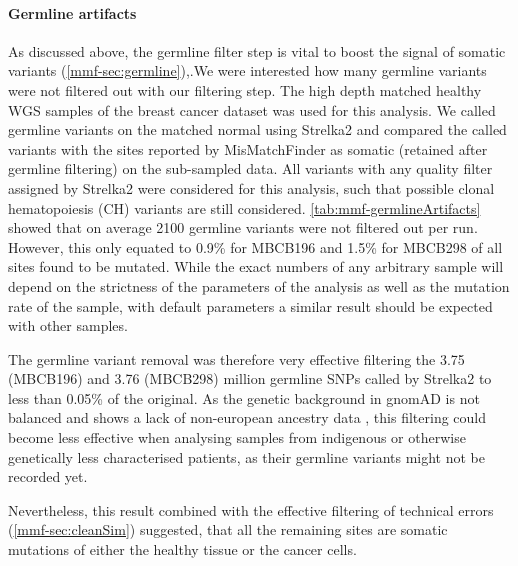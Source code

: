 \paragraph{Germline artifacts}
\label{mmf-sec:germlineArtifacts}
As discussed above, the germline filter step is vital to boost the signal of somatic variants (\autoref{mmf-sec:germline}),.We were interested how many germline variants were not filtered out with our filtering step. The high depth matched healthy WGS samples of the breast cancer dataset was used for this analysis. We called germline variants on the matched normal using Strelka2 and compared the called variants with the sites reported by MisMatchFinder as somatic (retained after germline filtering) on the sub-sampled data. All variants with any quality filter assigned by Strelka2 were considered for this analysis, such that possible clonal hematopoiesis (CH) variants are still considered. \autoref{tab:mmf-germlineArtifacts} showed that on average 2100 germline variants were not filtered out per run. However, this only equated to 0.9\% for MBCB196 and 1.5\% for MBCB298 of all sites found to be mutated. While the exact numbers of any arbitrary sample will depend on the strictness of the parameters of the analysis as well as the mutation rate of the sample, with default parameters a similar result should be expected with other samples.

The germline variant removal was therefore very effective filtering the 3.75 (MBCB196) and 3.76 (MBCB298) million germline SNPs called by Strelka2 to less than 0.05\% of the original. As the genetic background in gnomAD is not balanced and shows a lack of non-european ancestry data \cite{Tiao2020}, this filtering could become less effective when analysing samples from indigenous or otherwise genetically less characterised patients, as their germline variants might not be recorded yet.

Nevertheless, this result combined with the effective filtering of technical errors (\autoref{mmf-sec:cleanSim}) suggested, that all the remaining sites are somatic mutations of either the healthy tissue or the cancer cells.

